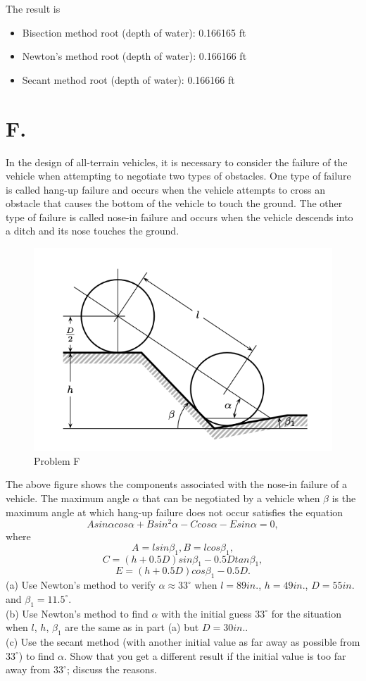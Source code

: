 \documentclass{article}
\begin{document}
\begin{CJK}{UTF8}{gbsn}
The result is
\begin{itemize}
    \item Bisection method root (depth of water): 0.166165 ft
    \item Newton's method root (depth of water): 0.166166 ft
    \item Secant method root (depth of water): 0.166166 ft
\end{itemize}

\section*{F.}
In the design of all-terrain vehicles, it is necessary to consider the failure of the vehicle when attempting to negotiate two types of obstacles. One type of failure is called hang-up failure and occurs when the vehicle attempts to cross an obstacle that causes the bottom of the vehicle to touch the ground. The other type of failure is called nose-in failure and occurs when the vehicle descends into a ditch and its nose touches the ground.
\begin{figure}[h]
    \centering
    \includegraphics[width=0.5\linewidth]{F.png}
    \caption{Problem F}
\end{figure}


The above figure shows the components associated with the nose-in failure of a vehicle. The maximum angle $\alpha$ that can be negotiated by a vehicle when $\beta$ is the maximum angle at which hang-up failure does not occur satisfies the equation
$$
A sin \alpha cos \alpha + B sin^2 \alpha - C cos \alpha - E sin \alpha = 0,
$$
where 
$$
A = lsin\beta_1, B = lcos\beta_1,
$$
$$
C = (h + 0.5D) sin \beta_1 - 0.5D tan \beta_1,
$$
$$
E = (h + 0.5D) cos \beta_1 - 0.5D.
$$
(a) Use Newton’s method to verify $\alpha \approx 33^{\circ}$ when $l = 89in.$, $h = 49in.$, $D = 55in.$ and $\beta_1 = 11.5^{\circ}$.\\
(b) Use Newton’s method to find $\alpha$ with the initial guess $33^{\circ}$ for the situation when $l$, $h$, $\beta_1$ are the same as in part (a) but $D = 30 in.$.\\
(c) Use the secant method (with another initial value as far away as possible from $33^{\circ}$) to find $\alpha$. Show that you get a different result if the initial value is too far away from $33^{\circ}$; discuss the reasons.\\


\end{CJK}
\end{document}

